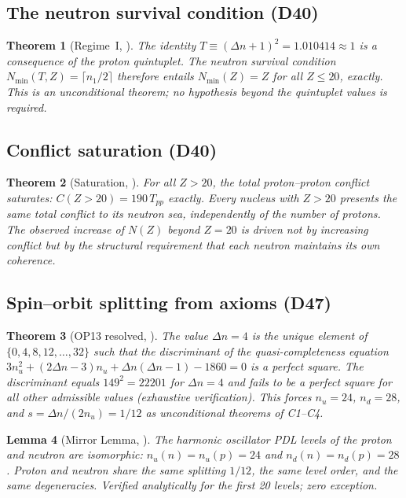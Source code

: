 \documentclass[11pt,a4paper]{article}
\theoremstyle{plain}
\newtheorem{theorem}{Theorem}[section]
\newtheorem{lemma}[theorem]{Lemma}
\theoremstyle{definition}
\theoremstyle{remark}
\newcommand{\Tpp}{T_{pp}}
\begin{document}
\subsection{The neutron survival condition (D40)}
\label{subsec:neutronsurvival}
\begin{theorem}[Regime~I, \cite{D40}]
\label{thm:NminI}
The identity $T\equiv(\Delta n+1)^2=1.010414\approx 1$ is a consequence of the proton quintuplet. The neutron survival condition $N_{\min}(T,Z)=\lceil n_1/2\rceil$ therefore entails $N_{\min}(Z)=Z$ for all $Z\leq 20$, exactly. This is an unconditional theorem; no hypothesis beyond the quintuplet values is required.
\end{theorem}

\subsection{Conflict saturation (D40)}
\label{subsec:conflictsat}
\begin{theorem}[Saturation, \cite{D40}]
\label{thm:saturation}
For all $Z>20$, the total proton--proton conflict saturates: $C(Z>20)=190\,\Tpp$ exactly. Every nucleus with $Z>20$ presents the same total conflict to its neutron sea, independently of the number of protons. The observed increase of $N(Z)$ beyond $Z=20$ is driven not by increasing conflict but by the structural requirement that each neutron maintains its own coherence.
\end{theorem}

\subsection{Spin--orbit splitting from axioms (D47)}
\label{subsec:spinorbit}
\begin{theorem}[OP13 resolved, \cite{D47}]
\label{thm:spinorbit}
The value $\Delta n = 4$ is the unique element of $\{0, 4, 8, 12, \ldots, 32\}$ such that the discriminant of the quasi-completeness equation $3n_u^2 + (2\Delta n - 3)n_u + \Delta n(\Delta n-1) - 1860 = 0$ is a perfect square. The discriminant equals $149^2 = 22201$ for $\Delta n = 4$ and fails to be a perfect square for all other admissible values (exhaustive verification). This forces $n_u = 24$, $n_d = 28$, and $s = \Delta n/(2n_u) = 1/12$ as unconditional theorems of C1--C4.
\end{theorem}

\begin{lemma}[Mirror Lemma, \cite{D47}]
\label{lem:mirror}
The harmonic oscillator PDL levels of the proton and neutron are isomorphic: $n_u(n) = n_u(p) = 24$ and $n_d(n) = n_d(p) = 28$. Proton and neutron share the same splitting $1/12$, the same level order, and the same degeneracies. Verified analytically for the first 20 levels; zero exception.
\end{lemma}
\end{document}
